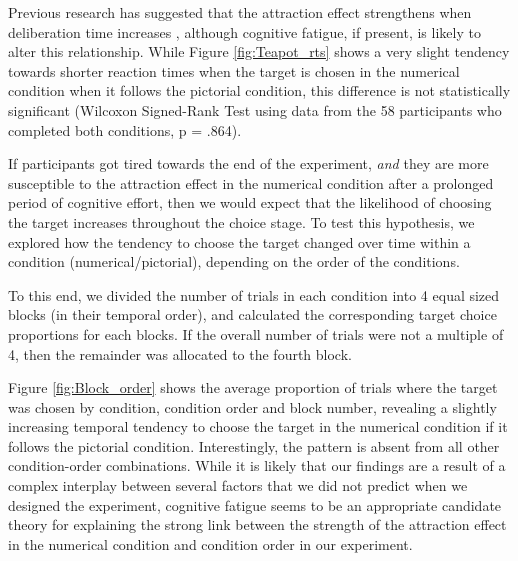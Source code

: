\documentclass[11pt,a4paper]{article}
\begin{document}
Previous research has suggested that the attraction effect strengthens when deliberation time increases \cite{Trueblood2014}, although cognitive fatigue, if present, is likely to alter this relationship. While Figure \ref{fig:Teapot_rts} shows a very slight tendency towards shorter reaction times when the target is chosen in the numerical condition when it follows the pictorial condition, this difference is not statistically significant (Wilcoxon Signed-Rank Test using data from the 58 participants who completed both conditions, p = .864).

If participants got tired towards the end of the experiment, \textit{and} they are more susceptible to the attraction effect in the numerical condition after a prolonged period of cognitive effort, then we would expect that the likelihood of choosing the target increases throughout the choice stage. To test this hypothesis, we explored how the tendency to choose the target changed over time within a condition (numerical/pictorial), depending on the order of the conditions.

To this end, we divided the number of trials in each condition into 4 equal sized blocks (in their temporal order), and calculated the corresponding target choice proportions for each blocks. If the overall number of trials were not a multiple of 4, then the remainder was allocated to the fourth block. 

Figure \ref{fig:Block_order} shows the average proportion of trials where the target was chosen by condition, condition order and block number, revealing a slightly increasing temporal tendency to choose the target in the numerical condition if it follows the pictorial condition. Interestingly, the pattern is absent from all other condition-order combinations. While it is likely that our findings are a result of a complex interplay between several factors that we did not predict when we designed the experiment, cognitive fatigue seems to be an appropriate candidate theory for explaining the strong link between the strength of the attraction effect in the numerical condition and condition order in our experiment.
\end{document}
